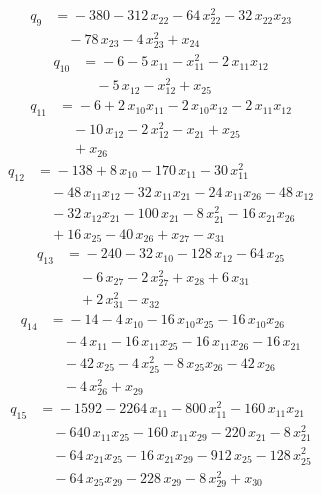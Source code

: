 \documentclass[11pt]{article}
\theoremstyle{remark}\newtheorem{remark}[theorem]{Remark}
\begin{document}
\begin{align*}
q_{9} &={}-380 -312\,x_{22} -64\,x_{22}^{2} -32\,x_{22}x_{23}\\
&\quad -78\,x_{23} -4\,x_{23}^{2} +x_{24}
\end{align*}
\begin{align*}
q_{10} &={}-6 -5\,x_{11} -x_{11}^{2} -2\,x_{11}x_{12}\\
&\quad -5\,x_{12} -x_{12}^{2} +x_{25}
\end{align*}
\begin{align*}
q_{11} &={}-6 +2\,x_{10}x_{11} -2\,x_{10}x_{12} -2\,x_{11}x_{12}\\
&\quad -10\,x_{12} -2\,x_{12}^{2} -x_{21} +x_{25}\\
&\quad +x_{26}
\end{align*}
\begin{align*}
q_{12} &={}-138 +8\,x_{10} -170\,x_{11} -30\,x_{11}^{2}\\
&\quad -48\,x_{11}x_{12} -32\,x_{11}x_{21} -24\,x_{11}x_{26} -48\,x_{12}\\
&\quad -32\,x_{12}x_{21} -100\,x_{21} -8\,x_{21}^{2} -16\,x_{21}x_{26}\\
&\quad +16\,x_{25} -40\,x_{26} +x_{27} -x_{31}
\end{align*}
\begin{align*}
q_{13} &={}-240 -32\,x_{10} -128\,x_{12} -64\,x_{25}\\
&\quad -6\,x_{27} -2\,x_{27}^{2} +x_{28} +6\,x_{31}\\
&\quad +2\,x_{31}^{2} -x_{32}
\end{align*}
\begin{align*}
q_{14} &={}-14 -4\,x_{10} -16\,x_{10}x_{25} -16\,x_{10}x_{26}\\
&\quad -4\,x_{11} -16\,x_{11}x_{25} -16\,x_{11}x_{26} -16\,x_{21}\\
&\quad -42\,x_{25} -4\,x_{25}^{2} -8\,x_{25}x_{26} -42\,x_{26}\\
&\quad -4\,x_{26}^{2} +x_{29}
\end{align*}
\begin{align*}
q_{15} &={}-1592 -2264\,x_{11} -800\,x_{11}^{2} -160\,x_{11}x_{21}\\
&\quad -640\,x_{11}x_{25} -160\,x_{11}x_{29} -220\,x_{21} -8\,x_{21}^{2}\\
&\quad -64\,x_{21}x_{25} -16\,x_{21}x_{29} -912\,x_{25} -128\,x_{25}^{2}\\
&\quad -64\,x_{25}x_{29} -228\,x_{29} -8\,x_{29}^{2} +x_{30}
\end{align*}
\end{document}

